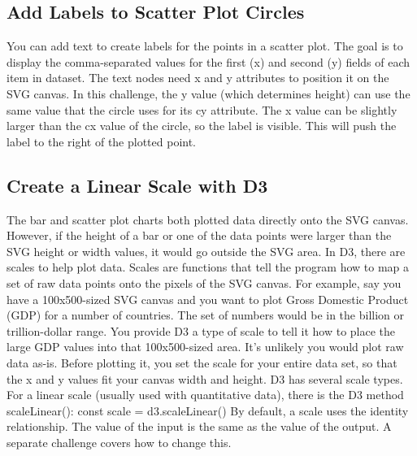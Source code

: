 \documentclass{article}%
\begin{document}
%
\subsection{Add Labels to Scatter Plot Circles}%
\label{subsec:AddLabelstoScatterPlotCircles}%
You can add text to create labels for the points in a scatter plot.\newline%
The goal is to display the comma{-}separated values for the first (x) and second (y) fields of each item in dataset.\newline%
The text nodes need x and y attributes to position it on the SVG canvas. In this challenge, the y value (which determines height) can use the same value that the circle uses for its cy attribute. The x value can be slightly larger than the cx value of the circle, so the label is visible. This will push the label to the right of the plotted point.\newline%

%
\subsection{Create a Linear Scale with D3}%
\label{subsec:CreateaLinearScalewithD3}%
The bar and scatter plot charts both plotted data directly onto the SVG canvas. However, if the height of a bar or one of the data points were larger than the SVG height or width values, it would go outside the SVG area.\newline%
In D3, there are scales to help plot data. Scales are functions that tell the program how to map a set of raw data points onto the pixels of the SVG canvas.\newline%
For example, say you have a 100x500{-}sized SVG canvas and you want to plot Gross Domestic Product (GDP) for a number of countries. The set of numbers would be in the billion or trillion{-}dollar range. You provide D3 a type of scale to tell it how to place the large GDP values into that 100x500{-}sized area.\newline%
It's unlikely you would plot raw data as{-}is. Before plotting it, you set the scale for your entire data set, so that the x and y values fit your canvas width and height.\newline%
D3 has several scale types. For a linear scale (usually used with quantitative data), there is the D3 method scaleLinear():\newline%
 const scale = d3.scaleLinear()\newline%
By default, a scale uses the identity relationship. The value of the input is the same as the value of the output. A separate challenge covers how to change this.\newline%
\end{document}

